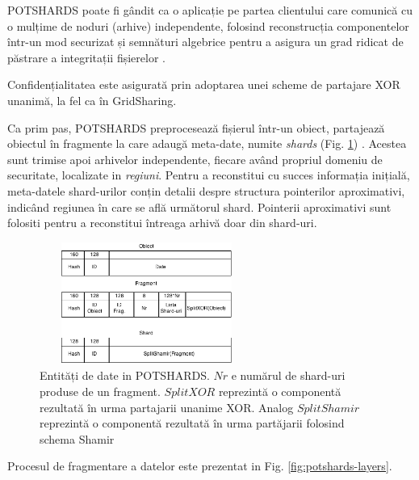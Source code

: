 \documentclass[oneside, 12pt]{book}
\begin{document}
POTSHARDS poate fi gândit ca o aplicație pe partea clientului care comunică cu o mulțime de noduri (arhive) independente, folosind reconstrucția componentelor într-un mod securizat și semnături algebrice pentru a asigura un grad ridicat de păstrare a integritații fișierelor \cite{STM:2006}.

Confidențialitatea este asigurată prin adoptarea unei scheme de partajare XOR unanimă, la fel ca în GridSharing.

Ca prim pas, POTSHARDS preprocesează fișierul într-un obiect, partajează obiectul în fragmente la care adaugă meta-date, numite \textit{shards} (Fig. \ref{fig:data-potshard}) \cite{SGMV:2009}. Acestea sunt trimise apoi arhivelor independente, fiecare având propriul domeniu de securitate, localizate in \textit{regiuni}. Pentru a reconstitui cu succes informația inițială, meta-datele shard-urilor conțin detalii despre structura pointerilor aproximativi, indicând regiunea în care se află următorul shard. Pointerii aproximativi sunt folositi pentru a reconstitui întreaga arhivă doar din shard-uri.

\begin{figure}[b!]
	\begin{center}
	\includegraphics[width=7cm, height=4cm]{img/Shards.png}    %
	\caption{Entități de date in POTSHARDS. $Nr$ e numărul de shard-uri produse de un fragment.
		$SplitXOR$ reprezintă o componentă rezultată în urma partajarii unanime XOR. Analog $SplitShamir$ reprezintă o componentă rezultată în urma partăjarii folosind schema Shamir \cite{SGMV:2009}}
	\label{fig:data-potshard}
	\bigskip
	\end{center}
\end{figure}

Procesul de fragmentare a datelor este prezentat in Fig. \ref{fig:potshards-layers}.
\end{document}
